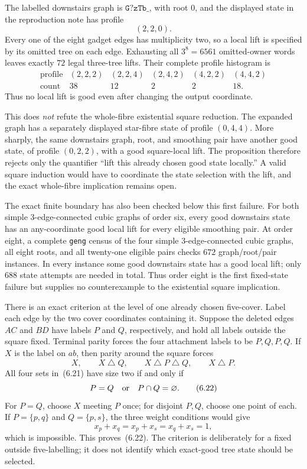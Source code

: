 \documentclass[11pt]{article}
\theoremstyle{definition}
\theoremstyle{remark}
\newcommand{\symdiff}{\mathbin{\triangle}}
\newcommand{\1}{\mathbf 1}
\begin{document}
The labelled downstairs graph is
\(\texttt{G?zTb\_}\), with root \(0\), and the displayed state in the
reproduction note has profile
\[
                              (2,2,0).
\]
Every one of the eight gadget edges has multiplicity two, so a local lift
is specified by its omitted tree on each edge.  Exhausting all
\(3^8=6561\) omitted-owner words leaves exactly \(72\) legal three-tree
lifts.  Their complete profile histogram is
\[
\begin{array}{c|rrrrr}
\text{profile}&(2,2,2)&(2,2,4)&(2,4,2)&(4,2,2)&(4,4,2)\\ \hline
\text{count}&38&12&2&2&18 .
\end{array}
\]
Thus no local lift is good even after changing the output coordinate.

This does \emph{not} refute the whole-fibre existential square reduction.
The expanded graph has a separately displayed star-fibre state of profile
\((0,4,4)\).  More sharply, the same downstairs graph, root, and smoothing
pair have another good state, of profile \((0,2,2)\), with a good
square-local lift.  The proposition therefore rejects only the quantifier
``lift this already chosen good state locally.''  A valid square induction
would have to coordinate the state selection with the lift, and the exact
whole-fibre implication remains open.

The exact finite boundary has also been checked below this first failure.
For both simple 3-edge-connected cubic graphs of order six, every good
downstairs state has an any-coordinate good local lift for every eligible
smoothing pair.  At order eight, a complete \texttt{geng} census of the
four simple 3-edge-connected cubic graphs, all eight roots, and all
twenty-one eligible pairs checks \(672\) graph/root/pair instances.  In
every instance some good downstairs state has a good local lift; only
\(688\) state attempts are needed in total.  Thus order eight is the first
fixed-state failure but supplies no counterexample to the existential
square implication.

There is an exact criterion at the level of one already chosen five-cover.
Label each edge by the two cover coordinates containing it.  Suppose the
deleted edges \(AC\) and \(BD\) have labels \(P\) and \(Q\), respectively,
and hold all labels outside the square fixed.  Terminal parity forces the
four attachment labels to be \(P,Q,P,Q\).  If \(X\) is the label on \(ab\),
then parity around the square forces
\[
 X,\qquad X\symdiff Q,\qquad X\symdiff P\symdiff Q,\qquad
 X\symdiff P.                                           \tag{6.21}
\]
All four sets in~(6.21) have size two if and only if
\[
                         P=Q\quad\hbox{or}\quad P\cap Q=\varnothing.
                                                               \tag{6.22}
\]
For \(P=Q\), choose \(X\) meeting \(P\) once; for disjoint \(P,Q\), choose
one point of each.  If \(P=\{p,q\}\) and \(Q=\{p,s\}\), the three weight
conditions would give
\[
 x_p+x_q=x_p+x_s=x_q+x_s=1,
\]
which is impossible.  This proves~(6.22).  The criterion is deliberately
for a fixed outside five-labelling; it does not identify which exact-good
tree state should be selected.
\end{document}

